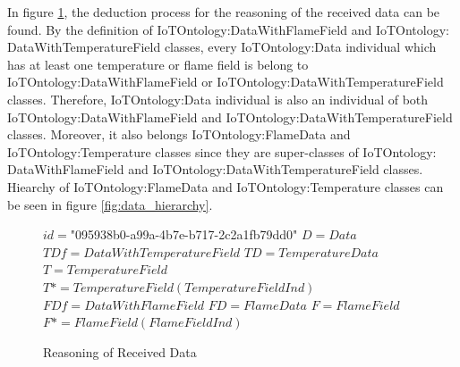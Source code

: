 In figure \ref{proof:data_proof}, the deduction process for the reasoning of the received data can be found. By the definition of IoTOntology:DataWithFlameField and IoTOntology: DataWithTemperatureField classes, every IoTOntology:Data individual which has at least one temperature or flame field is belong to IoTOntology:DataWithFlameField or IoTOntology:DataWithTemperatureField classes. Therefore,  IoTOntology:Data individual is also an individual of both IoTOntology:DataWithFlameField and IoTOntology:DataWithTemperatureField classes. Moreover, it also belongs IoTOntology:FlameData and IoTOntology:Temperature classes since they are super-classes of IoTOntology: DataWithFlameField and IoTOntology:DataWithTemperatureField classes. Hiearchy of IoTOntology:FlameData and IoTOntology:Temperature classes can be seen in figure  \ref{fig:data_hierarchy}.
\begin{figure}[H]
$id = $"095938b0-a99a-4b7e-b717-2c2a1fb79dd0"\newline
$D = Data$\newline
$TDf = DataWithTemperatureField$\newline
$TD = TemperatureData$\newline
$T = TemperatureField$ \newline
$T* = TemperatureField(TemperatureFieldInd)$\newline
$FDf = DataWithFlameField$\newline
$FD = FlameData$\newline
$F = FlameField$\newline
$F* = FlameField(FlameFieldInd)$\newline
\begin{prooftree}
\end{prooftree}
\begin{prooftree}
\end{prooftree}
  \caption[Reasoning of a Sample Data]{Reasoning of Received Data}\label{proof:data_proof}
\end{figure}
